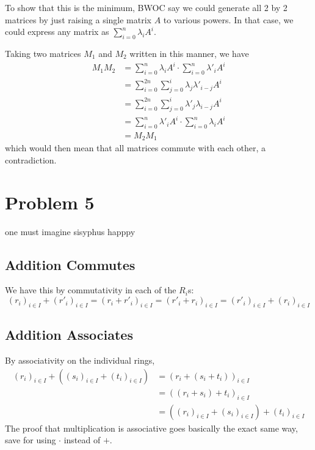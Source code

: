 \documentclass[12pt]{article}
\begin{document}
To show that this is the minimum, BWOC say we could generate all 2 by 2 matrices
by just raising a single matrix $A$ to various powers.
In that case, we could express any matrix as $\sum_{i=0}^{n} \lambda_i A^i$.

Taking two matrices $M_1$ and $M_2$ written in this manner, we have
\begin{align*}
  M_1M_2
   & = \sum_{i=0}^{n} \lambda_i A^i \cdot \sum_{i=0}^{n} \lambda'_i A^i \\
   & = \sum_{i=0}^{2n} \sum_{j=0}^{i} \lambda_j \lambda'_{i-j} A^i      \\
   & = \sum_{i=0}^{2n} \sum_{j=0}^{i} \lambda'_j \lambda_{i-j} A^i      \\
   & = \sum_{i=0}^{n} \lambda'_i A^i \cdot \sum_{i=0}^{n} \lambda_i A^i \\
   & = M_2M_1
\end{align*}
which would then mean that all matrices commute with each other, a contradiction.

\section{Problem 5}

one must imagine sisyphus happpy

\subsection{Addition Commutes}

We have this by commutativity in each of the $R_i$s:
\[(r_i)_{i \in I}+(r'_i)_{i \in I}=(r_i+r'_i)_{i \in I}=(r'_i+r_i)_{i \in I}=(r'_i)_{i \in I}+(r_i)_{i \in I}\]

\subsection{Addition Associates}

By associativity on the individual rings,
\begin{align*}
  (r_i)_{i \in I}+((s_i)_{i \in I}+(t_i)_{i \in I})
   & = (r_i+(s_i+t_i))_{i \in I}                         \\
   & = ((r_i+s_i)+t_i)_{i \in I}                         \\
   & = ((r_i)_{i \in I}+(s_i)_{i \in I})+(t_i)_{i \in I}
\end{align*}
The proof that multiplication is associative goes basically the exact same way,
save for using $\cdot$ instead of $+$.
\end{document}

